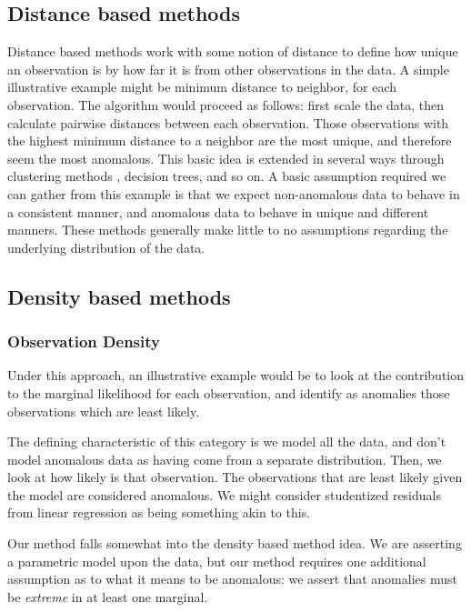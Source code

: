 \subsection{Distance based methods}
Distance based methods work with some notion of distance to define how unique an
  observation is by how far it is from other observations in the data.  A simple
  illustrative example might be minimum distance to neighbor, for each
  observation.  The algorithm would proceed as follows: first scale the data,
  then calculate pairwise distances between each observation. Those observations
  with the highest minimum distance to a neighbor are the most unique, and
  therefore seem the most anomalous.   This basic idea is extended in several ways through
  clustering methods , decision
  trees, and so on.  A basic
  assumption required we can gather from this example is that we expect
  non-anomalous data to behave in a consistent manner, and anomalous data to
  behave in unique and different manners.  These methods generally make little
  to no assumptions regarding the underlying distribution of the data.


\subsection{Density based methods}


\subsubsection{Observation Density}
Under this approach, an illustrative example would be to look at the
  contribution to the marginal likelihood for each observation, and identify as
  anomalies those observations which are least likely.


The defining characteristic of this category is we model all the data, and don't
  model anomalous data as having come from a separate distribution.  Then, we
  look at how likely is that observation.  The observations that are least
  likely given the model are considered anomalous.  We might consider
  studentized residuals from linear regression as being something akin to this.

Our method falls somewhat into the density based method idea.  We are asserting
  a parametric model upon the data, but our method requires one additional
  assumption as to what it means to be anomalous: we assert that anomalies must
  be \emph{extreme} in at least one marginal.

